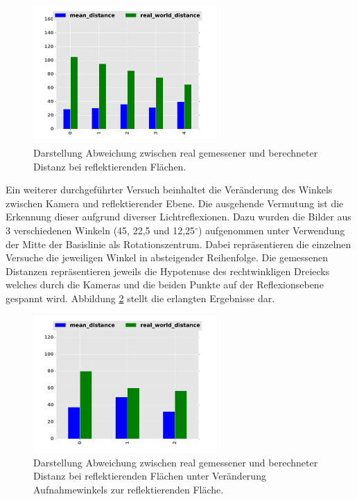 \begin{figure}[h]
	\centering
	\includegraphics[width=7cm]{img/reflection/reflection_bar}
	\caption{Darstellung Abweichung zwischen real gemessener und berechneter Distanz bei reflektierenden Flächen.}
	\label{fig:reflection_only}	
\end{figure}

\noindent
Ein weiterer durchgeführter Versuch beinhaltet die Veränderung des Winkels zwischen Kamera und reflektierender Ebene. Die ausgehende Vermutung ist die Erkennung dieser aufgrund diverser Lichtreflexionen. Dazu wurden die Bilder aus 3 verschiedenen Winkeln (45, 22,5 und 12,25$^\circ$) aufgenommen unter Verwendung der Mitte der Basislinie als Rotationszentrum. Dabei repräsentieren die einzelnen Versuche die jeweiligen Winkel in absteigender Reihenfolge. Die gemessenen Distanzen repräsentieren jeweils die Hypotenuse des rechtwinkligen Dreiecks welches durch die Kameras und die beiden Punkte auf der Reflexionsebene gespannt wird. Abbildung \ref{fig:rotation_angle} stellt die erlangten Ergebnisse dar.\\

\begin{figure}
	\centering
	\includegraphics[width=7cm]{img/reflection/angle_bar}
	\caption{Darstellung Abweichung zwischen real gemessener und berechneter Distanz bei reflektierenden Flächen unter Veränderung Aufnahmewinkels zur reflektierenden Fläche.}
	\label{fig:rotation_angle}
\end{figure}

